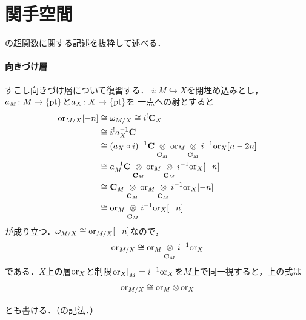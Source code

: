 \renewcommand{\Re}{\mathop{\mathrm{Re}}\nolimits}







\def\inner<#1>{\langle #1 \rangle}








\maketitle

\section{関手空間}

\cite[Section.4]{Sch04}の超関数に関する記述を抜粋して述べる．

\paragraph{向きづけ層}
すこし向きづけ層について復習する．
\(i\colon M\hookrightarrow X\)を閉埋め込みとし，
\(a_M\colon M\to\{\pt\}\)と\(a_X\colon X\to\{\pt\}\)を
一点への射とすると
\begin{align*}
    \ori_{M/X}[-n]
    &\cong \omega_{M/X} \cong i^{!}\cc_X\\
    &\cong i^{!}a_{X}^{-1}\cc\\
    &\cong (a_{X}\circ i)^{-1}\cc\ttens[\cc_M]\ori_{M}\ttens[\cc_M]i^{-1}\ori_{X}[n-2n]\\
    &\cong a_{M}^{-1}\cc\ttens[\cc_M]\ori_{M}\ttens[\cc_M]i^{-1}\ori_{X}[-n]\\
    &\cong \cc_{M}\ttens[\cc_M]\ori_{M}\ttens[\cc_M]i^{-1}\ori_{X}[-n]\\
    &\cong \ori_{M}\ttens[\cc_M]i^{-1}\ori_{X}[-n]
\end{align*}
が成り立つ．\(\omega_{M/X}\cong\ori_{M/X}[-n]\)なので，
\begin{equation}\label{eq:rel-ori1}
    \ori_{M/X}\cong \ori_{M}\ttens[\cc_M]i^{-1}\ori_{X}    
\end{equation}
である．\(X\)上の層\(\ori_X\)と制限\(
    \mres[\ori_{X}]{M}=i^{-1}\ori_{X}
\)を\(M\)上で同一視すると，上の式は
\begin{equation}\label{eq:rel-ori2}
    \ori_{M/X}\cong \ori_{M}\ttens \ori_{X}    
\end{equation}
とも書ける．（\cite[p.130]{KS90}の記法．）

